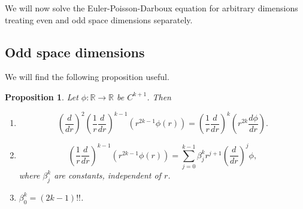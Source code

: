 \documentclass{article}
\newcommand{\td}[2]{\frac{d{#1}}{d{#2}}}
\theoremstyle{plain}
\numberwithin{thm}{section}
\theoremstyle{plain}
\newtheorem{prop}{Proposition}
\numberwithin{prop}{section}
\theoremstyle{definition}
\numberwithin{defn}{section}
\theoremstyle{remark}
\numberwithin{equation}{section}
\begin{document}
We will now solve the Euler-Poisson-Darboux equation for arbitrary dimensions treating even and odd space 
dimensions separately.

\subsection{Odd space dimensions}
We will find the following proposition useful.
\begin{prop}\label{s28p2}
Let $\phi: \mathbb{R} \rightarrow \mathbb{R}$ be $C^{k+1}$. Then
\begin{enumerate}
\item \begin{equation}\label{s28e44}
\left(\frac{d}{dr}\right)^2\left(\frac{1}{r}\frac{d}{dr}\right)^{k-1}\left(r^{2k-1}\phi(r)\right) = 
\left(\frac{1}{r}\frac{d}{dr}\right)^k\left(r^{2k}\td{\phi}{r}\right).
\end{equation}
\item \begin{equation}\label{s28e45}
\left(\frac{1}{r}\frac{d}{dr}\right)^{k-1}\left(r^{2k-1}\phi(r)\right) = 
\sum_{j=0}^{k-1}\beta^k_j r^{j+1}\left(\frac{d}{dr}\right)^{j}\phi,
\end{equation}
where $\beta^k_j$ are constants, independent of $r$.
\item $\beta^k_0 = (2k-1)!!$.
\end{enumerate}
\end{prop}
\end{document}
